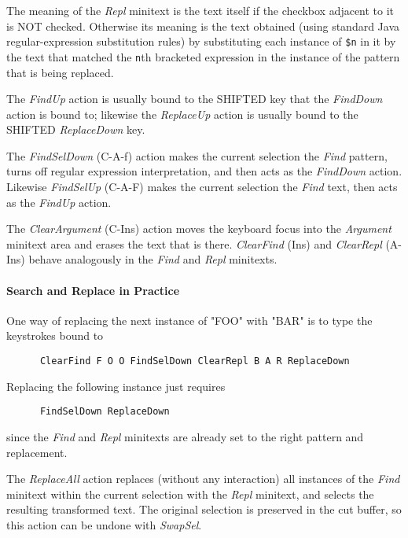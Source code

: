 \documentclass[
]{article}
\begin{document}
The meaning of the \emph{Repl} minitext is the text itself if the
checkbox adjacent to it is NOT checked. Otherwise its meaning is the
text obtained (using standard Java regular-expression substitution
rules) by substituting each instance of \texttt{\$n} in it by the text
that matched the \texttt{n}th bracketed expression in the instance of
the pattern that is being replaced.

The \emph{FindUp} action is usually bound to the SHIFTED key that the
\emph{FindDown} action is bound to; likewise the \emph{ReplaceUp} action
is usually bound to the SHIFTED \emph{ReplaceDown} key.

The \emph{FindSelDown} (C-A-f) action makes the current selection the
\emph{Find} pattern, turns off regular expression interpretation, and
then acts as the \emph{FindDown} action. Likewise \emph{FindSelUp}
(C-A-F) makes the current selection the \emph{Find} text, then acts as
the \emph{FindUp} action.

The \emph{ClearArgument} (C-Ins) action moves the keyboard focus into
the \emph{Argument} minitext area and erases the text that is there.
\emph{ClearFind} (Ins) and \emph{ClearRepl} (A-Ins) behave analogously
in the \emph{Find} and \emph{Repl} minitexts.

\hypertarget{search-and-replace-in-practice}{%
\paragraph{Search and Replace in
Practice}\label{search-and-replace-in-practice}}

One way of replacing the next instance of "FOO" with "BAR" is to type
the keystrokes bound to

\begin{verbatim}
      ClearFind F O O FindSelDown ClearRepl B A R ReplaceDown
\end{verbatim}

Replacing the following instance just requires

\begin{verbatim}
      FindSelDown ReplaceDown
\end{verbatim}

since the \emph{Find} and \emph{Repl} minitexts are already set to the
right pattern and replacement.

The \emph{ReplaceAll} action replaces (without any interaction) all
instances of the \emph{Find} minitext within the current selection with
the \emph{Repl} minitext, and selects the resulting transformed text.
The original selection is preserved in the cut buffer, so this action
can be undone with \emph{SwapSel}.
\end{document}
